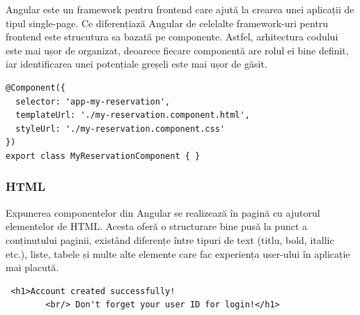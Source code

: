 \hspace{0cm} Angular este un framework pentru frontend care ajută la crearea unei aplicații de tipul single-page. Ce diferențiază Angular de celelalte framework-uri pentru frontend este strucutura sa bazată pe componente. Astfel, arhitectura codului este mai ușor de organizat, deoarece fiecare componentă are rolul ei bine definit, iar identificarea unei potențiale greșeli este mai ușor de găsit.\cite{citation5}

\begin{center}
\begin{minipage}{0.8\textwidth}
\captionsetup{type=listing}
   \begin{lstlisting}
@Component({
  selector: 'app-my-reservation',
  templateUrl: './my-reservation.component.html',
  styleUrl: './my-reservation.component.css'
})
export class MyReservationComponent { }
\end{lstlisting} 
\end{minipage}
\end{center}


\vspace{0.5em}


\begin{minipage}{\textwidth}
\hfill
\begin{minipage}{0.9\textwidth}
\subsubsection{HTML}
\end{minipage}
\end{minipage}

\hspace{0cm} Expunerea componentelor din Angular se realizează în pagină cu ajutorul elementelor de HTML. Acesta oferă o structurare bine pusă la punct a conținutului paginii, existând diferențe între tipuri de text (titlu, bold, itallic etc.), liste, tabele și multe alte elemente care fac experiența user-ului în aplicație mai placută. 

\begin{center}
\begin{minipage}{0.8\textwidth}
\captionsetup{type=listing}
   \begin{lstlisting}
 <h1>Account created successfully!
        <br/> Don't forget your user ID for login!</h1>
\end{lstlisting} 
\end{minipage}
\end{center}

